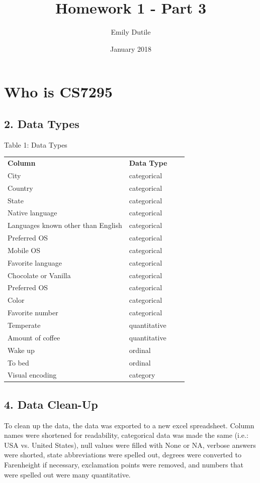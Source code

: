 \documentclass{neu_handout}
\title{Homework 1 - Part 3}
\author{Emily Dutile}
\date{January 2018}
\begin{document}
\section*{Who is CS7295}

\subsection*{2. Data Types}

\begin{center}
Table 1: Data Types
\end{center}
\begin{center} 
\begin{tabular}[h]{l l l l}
\textbf{Column} & \textbf{Data Type} \\
City & categorical \\
Country & categorical \\ 
State & categorical \\
Native language & categorical \\
Languages known other than English & categorical \\
Preferred OS & categorical \\
Mobile OS & categorical \\
Favorite language & categorical \\
Chocolate or Vanilla & categorical \\
Preferred OS & categorical \\
Color & categorical \\
Favorite number & categorical \\
Temperate & quantitative \\
Amount of coffee & quantitative \\
Wake up & ordinal \\
To bed & ordinal \\
Visual encoding & category
\end{tabular}
\end{center}

\subsection*{4. Data Clean-Up}
To clean up the data, the data was exported to a new excel spreadsheet. Column names were shortened for readability, categorical data was made the same (i.e.: USA vs. United States), null values were filled with None or NA, verbose answers were shorted, state abbreviations were spelled out, degrees were converted to Farenheight if necessary, exclamation points were removed, and numbers that were spelled out were many quantitative.\\
\end{document}
